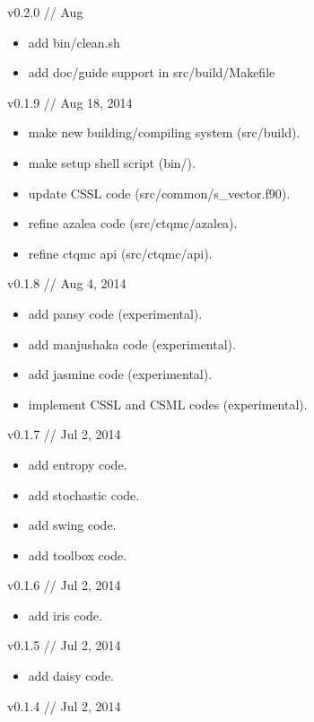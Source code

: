 v0.2.0 // Aug

\begin{itemize}
\item add bin/clean.sh
\item add doc/guide support in src/build/Makefile
\end{itemize}

v0.1.9 // Aug 18, 2014

\begin{itemize}
\item make new building/compiling system (src/build).
\item make setup shell script (bin/).
\item update CSSL code (src/common/s\_vector.f90).
\item refine azalea code (src/ctqmc/azalea).
\item refine ctqmc api (src/ctqmc/api).
\end{itemize}


v0.1.8 // Aug 4, 2014

\begin{itemize}
\item add pansy code (experimental).
\item add manjushaka code (experimental).
\item add jasmine code (experimental).
\item implement CSSL and CSML codes (experimental).
\end{itemize}


v0.1.7 // Jul 2, 2014

\begin{itemize}
\item add entropy code.
\item add stochastic code.
\item add swing code.
\item add toolbox code.
\end{itemize}


v0.1.6 // Jul 2, 2014

\begin{itemize}
\item add iris code.
\end{itemize}


v0.1.5 // Jul 2, 2014

\begin{itemize}
\item add daisy code.
\end{itemize}


v0.1.4 // Jul 2, 2014

